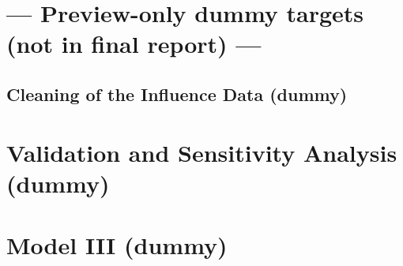 \documentclass[11pt,letterpaper]{article}
\numberwithin{equation}{section}
\begin{document}
\section*{--- Preview-only dummy targets (not in final report) ---}
\addtocounter{section}{1}\setcounter{subsection}{0}
\subsection{Cleaning of the Influence Data (dummy)}\label{subsec:data-cleaning}
\addtocounter{section}{1}
\section{Validation and Sensitivity Analysis (dummy)}\label{sec:validation}
\addtocounter{section}{1}
\section{Model III (dummy)}\label{sec:model-genre}


\end{document}
